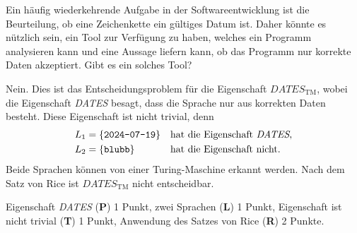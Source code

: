 Ein häufig wiederkehrende Aufgabe in der Softwareentwicklung ist die
Beurteilung, ob eine Zeichenkette ein gültiges Datum ist.
Daher könnte es nützlich sein, ein Tool zur Verfügung zu haben,
welches ein Programm analysieren kann und eine Aussage liefern kann,
ob das Programm nur korrekte Daten akzeptiert.
Gibt es ein solches Tool?

\begin{loesung}
Nein.
Dies ist das Entscheidungsproblem für die Eigenschaft
$\textit{DATES}_{\text{TM}}$, wobei die Eigenschaft \textit{DATES}
besagt, dass die Sprache nur aus korrekten Daten besteht.
Diese Eigenschaft ist nicht trivial, denn 
\[
\begin{aligned}
L_1&=\{\texttt{2024-07-19}\}&&\text{hat die Eigenschaft \textit{DATES},}\\
L_2&=\{\texttt{blubb}\}&&\text{hat die Eigenschaft nicht.}
\end{aligned}
\]
Beide Sprachen können von einer Turing-Maschine erkannt werden.
Nach dem Satz von Rice ist $\textit{DATES}_{\text{TM}}$ nicht
entscheidbar.
\end{loesung}

\begin{bewertung}
Eigenschaft \textit{DATES} ({\bf P}) 1 Punkt,
zwei Sprachen ({\bf L}) 1 Punkt,
Eigenschaft ist nicht trivial ({\bf T}) 1 Punkt,
Anwendung des Satzes von Rice ({\bf R}) 2 Punkte.
\end{bewertung}


